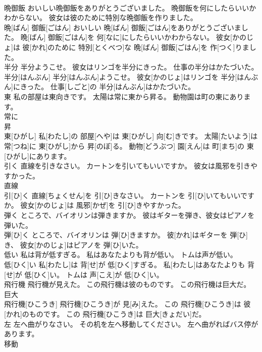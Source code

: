 \documentclass[8pt]{extreport}
\begin{document}
\begin{CJK}{UTF8}{min}
\\	晩御飯 おいしい晩御飯をありがとうございました。 晩御飯を何にしたらいいかわからない。 彼女は彼のために特別な晩御飯を作りました。	
\\	晩[ばん] 御飯[ごはん] おいしい 晩[ばん] 御飯[ごはん]をありがとうございました。 晩[ばん] 御飯[ごはん]を 何[なに]にしたらいいかわからない。 彼女[かのじょ]は 彼[かれ]のために 特別[とくべつ]な 晩[ばん] 御飯[ごはん]を 作[つく]りました。
\\	半分 半分ようこせ。 彼女はリンゴを半分にきった。 仕事の半分はかたづいた。	
\\	半分[はんぶん] 半分[はんぶん]ようこせ。 彼女[かのじょ]はリンゴを 半分[はんぶん]にきった。 仕事[しごと]の 半分[はんぶん]はかたづいた。
\\	東 私の部屋は東向きです。 太陽は常に東から昇る。 動物園は町の東にあります。	
\\	常に 
\\	昇 
\\	東[ひがし] 私[わたし]の 部屋[へや]は 東[ひがし] 向[む]きです。 太陽[たいよう]は 常[つね]に 東[ひがし]から 昇[のぼ]る。 動物[どうぶつ] 園[えん]は 町[まち]の 東[ひがし]にあります。
\\	引く 直線を引きなさい。 カートンを引いてもいいですか。 彼女は風邪を引きやすかった。	
\\	直線 
\\	引[ひ]く 直線[ちょくせん]を 引[ひ]きなさい。 カートンを 引[ひ]いてもいいですか。 彼女[かのじょ]は 風邪[かぜ]を 引[ひ]きやすかった。
\\	弾く ところで、バイオリンは弾きますか。 彼はギターを弾き、彼女はピアノを弾いた。	
\\	弾[ひ]く ところで、バイオリンは 弾[ひ]きますか。 彼[かれ]はギターを 弾[ひ]き、 彼女[かのじょ]はピアノを 弾[ひ]いた。
\\	低い 私は背が低すぎる。 私はあなたよりも背が低い。 トムは声が低い。	
\\	低[ひく]い 私[わたし]は 背[せ]が 低[ひく]すぎる。 私[わたし]はあなたよりも 背[せ]が 低[ひく]い。 トムは 声[こえ]が 低[ひく]い。
\\	飛行機 飛行機が見えた。 この飛行機は彼のものです。 この飛行機は巨大だ。	
\\	巨大　
\\	飛行機[ひこうき] 飛行機[ひこうき]が 見[み]えた。 この 飛行機[ひこうき]は 彼[かれ]のものです。 この 飛行機[ひこうき]は 巨大[きょだい]だ。
\\	左 左へ曲がりなさい。 その机を左へ移動してください。 左へ曲がればバス停があります。	
\\	移動 

\end{CJK}
\end{document}
